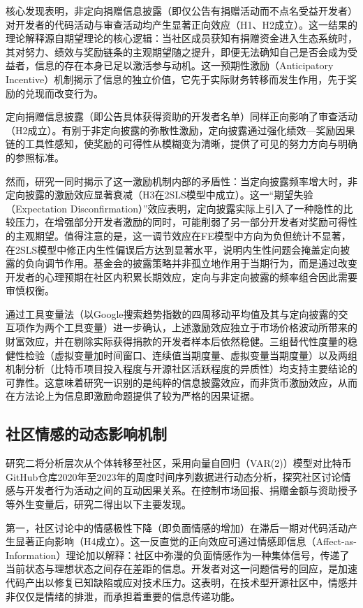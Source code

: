\documentclass[
    type = master, %
    degree = professional,        %
    decl-page,  %
    twoside,                %
    fontset = fandol %
  ]{njuthesis}
\begin{document}
核心发现表明，非定向捐赠信息披露（即仅公告有捐赠活动而不点名受益开发者）对开发者的代码活动与审查活动均产生显著正向效应（H1、H2成立）。这一结果的理论解释源自期望理论的核心逻辑：当社区成员获知有捐赠资金进入生态系统时，其对努力、绩效与奖励链条的主观期望随之提升，即便无法确知自己是否会成为受益者，信息的存在本身已足以激活参与动机。这一预期性激励（Anticipatory Incentive）机制揭示了信息的独立价值，它先于实际财务转移而发生作用，先于奖励的兑现而改变行为。

定向捐赠信息披露（即公告具体获得资助的开发者名单）同样正向影响了审查活动（H2成立）。有别于非定向披露的弥散性激励，定向披露通过强化绩效—奖励因果链的工具性感知，使奖励的可得性从模糊变为清晰，提供了可见的努力方向与明确的参照标准。

然而，研究一同时揭示了这一激励机制内部的矛盾性：当定向披露频率增大时，非定向披露的激励效应显著衰减（H3在2SLS模型中成立）。这一“期望失验（Expectation Disconfirmation）”效应表明，定向披露实际上引入了一种隐性的比较压力，在增强部分开发者激励的同时，可能削弱了另一部分开发者对奖励可得性的主观期望。值得注意的是，这一调节效应在FE模型中方向为负但统计不显著，在2SLS模型中修正内生性偏误后方达到显著水平，说明内生性问题会掩盖定向披露的负向调节作用。基金会的披露策略并非孤立地作用于当期行为，而是通过改变开发者的心理预期在社区内积累长期效应，定向与非定向披露的频率组合因此需要审慎权衡。

通过工具变量法（以Google搜索趋势指数的四周移动平均值及其与定向披露的交互项作为两个工具变量）进一步确认，上述激励效应独立于市场价格波动所带来的财富效应，并在剔除实际获得捐款的开发者样本后依然稳健。三组替代性度量的稳健性检验（虚拟变量加时间窗口、连续值当期度量、虚拟变量当期度量）以及两组机制分析（比特币项目投入程度与开源社区活跃程度的异质性）均支持主要结论的可靠性。这意味着研究一识别的是纯粹的信息披露效应，而非货币激励效应，从而在方法论上为信息即激励命题提供了较为严格的因果证据。

\subsection{社区情感的动态影响机制}

研究二将分析层次从个体转移至社区，采用向量自回归（VAR(2)）模型对比特币GitHub仓库2020年至2023年的周度时间序列数据进行动态分析，探究社区讨论情感与开发者行为活动之间的互动因果关系。在控制市场回报、捐赠金额与资助授予等外生变量后，研究二得出以下主要发现。

第一，社区讨论中的情感极性下降（即负面情感的增加）在滞后一期对代码活动产生显著正向影响（H4成立）。这一反直觉的正向效应可通过情感即信息（Affect-as-Information）理论加以解释\cite{schwarz1983moods}：社区中弥漫的负面情感作为一种集体信号，传递了当前状态与理想状态之间存在差距的信息。开发者对这一问题信号的回应，是加速代码产出以修复已知缺陷或应对技术压力。这表明，在技术型开源社区中，情感并非仅仅是情绪的排泄，而承担着重要的信息传递功能。
\end{document}
